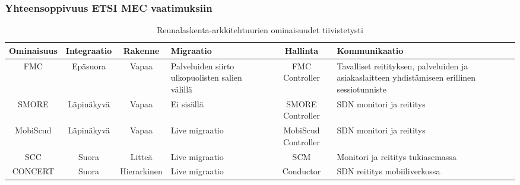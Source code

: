 \subsubsection*{Yhteensoppivuus ETSI MEC vaatimuksiin}
%
%
%
%
%
%

\begin{landscape}
    \noindent
\begin{table}[!ht]
\caption{Reunalaskenta-arkkitehtuurien ominaisuudet tiivistetysti}
\label{table:features}
\begin{tabularx}{ \linewidth }{ | c | c | c | p{3cm} | c | p{5cm} | }
\hline 
 \textbf{Ominaisuus} & \textbf{Integraatio} & \textbf{Rakenne} & \textbf{Migraatio} & \textbf{Hallinta} & \textbf{Kommunikaatio} \\ 
\hline 
 FMC & Epäsuora & Vapaa & Palveluiden siirto ulkopuolisten salien välillä & FMC Controller & Tavalliset reitityksen, palveluiden ja asiakaslaitteen yhdistämiseen erillinen sessiotunniste \\ 
\hline 
 SMORE & Läpinäkyvä & Vapaa & Ei sisällä & SMORE Controller & SDN monitori ja reititys \\ 
\hline 
MobiScud & Läpinäkyvä & Vapaa & Live migraatio & MobiScud Controller & SDN monitori ja reititys\\ 
\hline 
SCC & Suora & Litteä & Live migraatio & SCM & Monitori ja reititys tukiasemassa \\ 
\hline 
CONCERT & Suora & Hierarkinen & Live migraatio & Conductor & SDN reititys mobiiliverkossa \\ 
\hline 
\end{tabularx} 
\end{table}
\end{landscape}